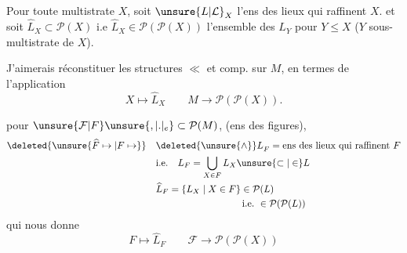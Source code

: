  Pour toute multistrate $X$, soit $\unsure{L|\mathcal{L}}_X$  l'ens des lieux qui raffinent $X$.
et soit $\widehat L_X\subset\mathcal P(X)$ i.e $\widehat L_X\in\mathcal P(\mathcal P(X))$ l'ensemble des  $L_Y$ pour $Y\leq X$ ($Y$ sous-multistrate de $X$).  

J'aimerais réconstituer les structures $\ll$ et comp. sur $M$, en termes de l'application
\[
 X\longmapsto\widehat L_X\qquad M\longrightarrow\mathcal P(\mathcal P(X)).
\]

  pour $\unsure{\mathcal F|F}\unsure{,|.|{}_{e}}\subset\mathcal P(M)$, (ens des figures),  
\[
\begin{aligned}
\deleted{\unsure{\widehat F\mapsto|F\mapsto}}\quad &{\deleted{\unsure{\wedge}}L}_F=\text{ens des lieux qui raffinent }F\\
 &\text{i.e.}\quad L_F=\bigcup_{X\in F}L_X\unsure{\subset|\in} L\\
 &\widehat L_F=\{L_X\mid X\in F\}\in\mathcal P(L)\\
 &\hspace{9em}\text{i.e.}\ \in\mathcal P(\mathcal P(L))
\end{aligned}
\]
qui nous donne
\[
 F\longmapsto\widehat L_F\qquad \mathcal F\longrightarrow\mathcal P(\mathcal P(X))
\]

 

